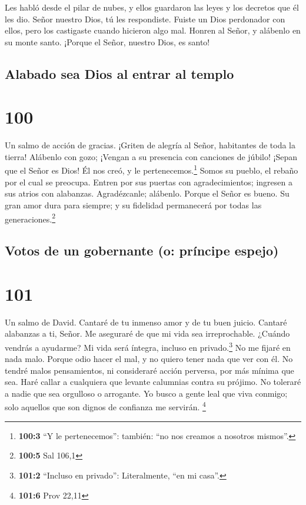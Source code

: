  Les habló desde el pilar de nubes, y ellos guardaron las
leyes y los decretos que él les dio.  Señor nuestro Dios,
tú les respondiste. Fuiste un Dios perdonador con ellos, pero los
castigaste cuando hicieron algo mal.  Honren al Señor, y
alábenlo en su monte santo. ¡Porque el Señor, nuestro Dios, es santo!

\hypertarget{alabado-sea-dios-al-entrar-al-templo}{%
\subsection{Alabado sea Dios al entrar al
templo}\label{alabado-sea-dios-al-entrar-al-templo}}

\hypertarget{section-99}{%
\section{100}\label{section-99}}

Un salmo de acción de gracias.  ¡Griten de alegría al
Señor, habitantes de toda la tierra!  Alábenlo con gozo;
¡Vengan a su presencia con canciones de júbilo!  ¡Sepan
que el Señor es Dios! Él nos creó, y le pertenecemos.\footnote{\textbf{100:3}
  ``Y le pertenecemos'': también: ``no nos creamos a nosotros mismos''.}
Somos su pueblo, el rebaño por el cual se preocupa. 
Entren por sus puertas con agradecimientos; ingresen a sus atrios con
alabanzas. Agradézcanle; alábenlo.  Porque el Señor es
bueno. Su gran amor dura para siempre; y su fidelidad permanecerá por
todas las generaciones.\footnote{\textbf{100:5} Sal 106,1}

\hypertarget{votos-de-un-gobernante-o-pruxedncipe-espejo}{%
\subsection{Votos de un gobernante (o: príncipe
espejo)}\label{votos-de-un-gobernante-o-pruxedncipe-espejo}}

\hypertarget{section-100}{%
\section{101}\label{section-100}}

Un salmo de David.  Cantaré de tu inmenso amor y de tu
buen juicio. Cantaré alabanzas a ti, Señor.  Me aseguraré
de que mi vida sea irreprochable. ¿Cuándo vendrás a ayudarme? Mi vida
será íntegra, incluso en privado.\footnote{\textbf{101:2} ``Incluso en
  privado'': Literalmente, ``en mi casa''.}  No me fijaré
en nada malo. Porque odio hacer el mal, y no quiero tener nada que ver
con él.  No tendré malos pensamientos, ni consideraré
acción perversa, por más mínima que sea.  Haré callar a
cualquiera que levante calumnias contra su prójimo. No toleraré a nadie
que sea orgulloso o arrogante.  Yo busco a gente leal que
viva conmigo; solo aquellos que son dignos de confianza me servirán.
\footnote{\textbf{101:6} Prov 22,11}

